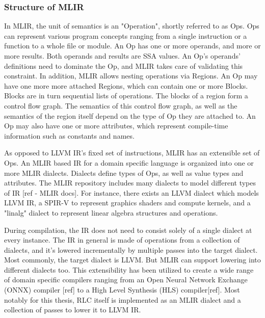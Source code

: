 \subsubsection{Structure of MLIR}
In MLIR, the unit of semantics is an "Operation", shortly referred to as Ops. Ops can represent various program concepts ranging from a single instruction or a function to a whole file or module.
An Op has one or more operands, and more or more results. Both operands and results are SSA values.
An Op's operands' definitions need to dominate the Op, and MLIR takes care of validating this constraint.
In addition, MLIR allows nesting operations via Regions. An Op may have one more more attached Regions, which can contain one or more Blocks.
Blocks are in turn sequential lists of operations.
The blocks of a region form a control flow graph.
The semantics of this control flow graph, as well as the semantics of the region itself depend on the type of Op they are attached to.
An Op may also have one or more attributes, which represent compile-time information such as constants and names.

As opposed to LLVM IR's fixed set of instructions, MLIR has an extensible set of Ops.
An MLIR based IR for a domain specific language is organized into one or more MLIR dialects.
Dialects define types of Ops, as well as value types and attributes.
The MLIR repository includes many dialects to model different types of IR [ref - MLIR docs].
For instance, there exists an LLVM dialect which models LLVM IR, a SPIR-V to represent graphics shaders and compute kernels, and a "linalg" dialect to represent linear algebra structures and operations.

During compilation, the IR does not need to consist solely of a single dialect at every instance.
The IR in general is made of operations from a collection of dialects, and it's lowered incrementally by multiple passes into the target dialect.
Most commonly, the target dialect is LLVM. But MLIR can support lowering into different dialects too.
This extensibility has been utilized to create a wide range of domain specific compilers ranging from an Open Neural Network Exchange (ONNX) compiler [ref] to a High Level Synthesis (HLS) compiler[ref].
Most notably for this thesis, RLC itself is implemented as an MLIR dialect and a collection of passes to lower it to LLVM IR.


